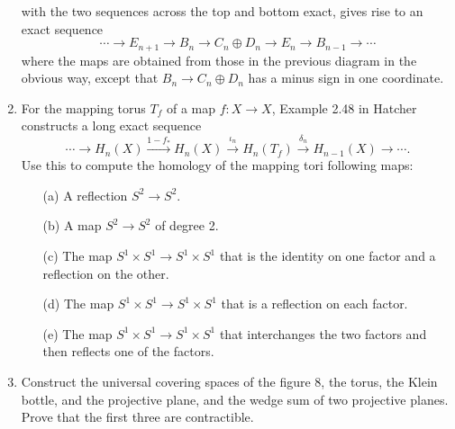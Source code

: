 \documentclass[10pt,notitlepage]{article}
\begin{document}
\begin{enumerate}
\begin{center}
	\end{center}
	with the two sequences across the top and bottom exact, gives rise to an exact sequence $$\cdots \rightarrow E_{n+1} \rightarrow B_{n} \rightarrow C_{n} \oplus D_{n} \rightarrow E_{n} \rightarrow B_{n-1} \rightarrow \cdots$$
	where the maps are obtained from those in the previous diagram in the obvious way, except that $B_{n} \rightarrow C_{n} \oplus D_{n}$ has a minus sign in one coordinate.
	\item For the mapping torus $T_{f}$ of a map $f:X \rightarrow X$, Example 2.48 in Hatcher constructs a long exact sequence $$\cdots \rightarrow H_{n}(X) \xrightarrow{1-f_{\ast}} H_{n}(X) \xrightarrow{\iota_{n}} H_{n}(T_{f}) \xrightarrow{\delta_{n}} H_{n-1}(X) \rightarrow \cdots.$$ Use this to compute the homology of the mapping tori following maps:
		\begin{enumerate}
			\item [(a)] A reflection $S^{2} \rightarrow S^{2}$.
			
			\item [(b)] A map $S^{2} \rightarrow S^{2}$ of degree 2.
			
			\item [(c)] The map $S^{1} \times S^{1} \rightarrow S^{1} \times S^{1}$ that is the identity on one factor and a reflection on the other. 
			
			\item [(d)] The map $S^{1} \times S^{1} \rightarrow S^{1} \times S^{1}$ that is a reflection on each factor.
			
			\item [(e)] The map $S^{1} \times S^{1} \rightarrow S^{1} \times S^{1}$ that interchanges the two factors and then reflects one of the factors.
		\end{enumerate}
	\item Construct the universal covering spaces of the figure 8, the torus, the Klein bottle, and the
	projective plane, and the wedge sum of two projective planes. Prove that the first three are
	contractible.
	\end{enumerate}
\end{document}
